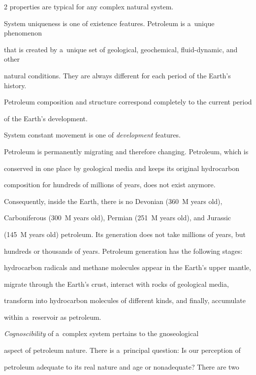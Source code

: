 \begin{multicols}{2}
properties are typical for any complex natural system.



System uniqueness is one of existence features. Petroleum is a~unique phenomenon 

that is created by a~unique set of geological, geochemical, fluid-dynamic, and other 

natural conditions. They are always different for each period of the Earth's history. 

Petroleum composition and structure correspond completely to the current period 

of the Earth's development. 

     

     System constant movement is one of \textit{development} features. 

Petroleum is permanently migrating and therefore changing. Petroleum, which is 

conserved in one place by geological media and keeps its original hydrocarbon 

composition for hundreds of millions of years, does not exist anymore. 

Consequently, inside the Earth, there is no Devonian (360~M years old), 

Carboniferous (300~M years old), Permian (251~M years old), and Jurassic 

(145~M years old) petroleum. Its generation does not take millions of years, but 

hundreds or thousands of years. Petroleum generation has the following stages: 

hydrocarbon radicals and methane molecules appear in the Earth's upper mantle, 

migrate through the Earth's crust, interact with rocks of geological media, 

transform into hydrocarbon molecules of different kinds, and finally, accumulate 

within a~reservoir as petroleum.

{



}

     

     \textit{Cognoscibility} of a~complex system pertains to the gnoseological 

aspect of petroleum nature. There is a~principal question: Is our perception of 

petroleum adequate to its real nature and age or nonadequate? There are two 


\end{multicols}
